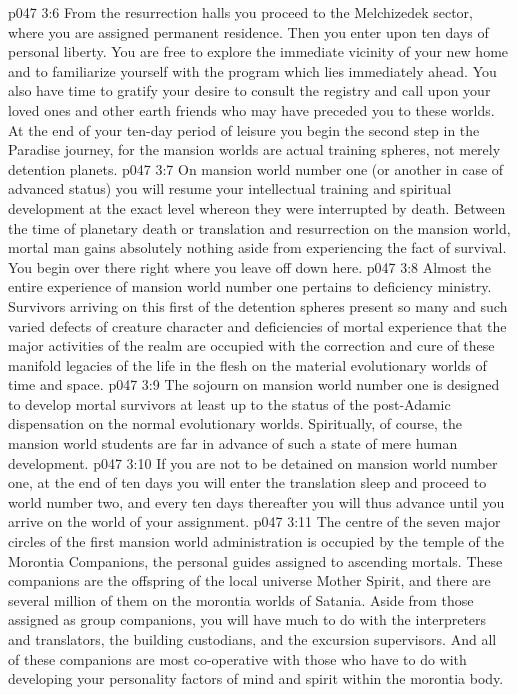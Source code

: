 \vs p047 3:6 \pc From the resurrection halls you proceed to the Melchizedek sector, where you are assigned permanent residence. Then you enter upon ten days of personal liberty. You are free to explore the immediate vicinity of your new home and to familiarize yourself with the program which lies immediately ahead. You also have time to gratify your desire to consult the registry and call upon your loved ones and other earth friends who may have preceded you to these worlds. At the end of your ten\hyp{}day period of leisure you begin the second step in the Paradise journey, for the mansion worlds are actual training spheres, not merely detention planets.
\vs p047 3:7 \pc On mansion world number one (or another in case of advanced status) you will resume your intellectual training and spiritual development at the exact level whereon they were interrupted by death. Between the time of planetary death or translation and resurrection on the mansion world, mortal man gains absolutely nothing aside from experiencing the fact of survival. You begin over there right where you leave off down here.
\vs p047 3:8 Almost the entire experience of mansion world number one pertains to deficiency ministry. Survivors arriving on this first of the detention spheres present so many and such varied defects of creature character and deficiencies of mortal experience that the major activities of the realm are occupied with the correction and cure of these manifold legacies of the life in the flesh on the material evolutionary worlds of time and space.
\vs p047 3:9 The sojourn on mansion world number one is designed to develop mortal survivors at least up to the status of the post\hyp{}Adamic dispensation on the normal evolutionary worlds. Spiritually, of course, the mansion world students are far in advance of such a state of mere human development.
\vs p047 3:10 If you are not to be detained on mansion world number one, at the end of ten days you will enter the translation sleep and proceed to world number two, and every ten days thereafter you will thus advance until you arrive on the world of your assignment.
\vs p047 3:11 \pc The centre of the seven major circles of the first mansion world administration is occupied by the temple of the Morontia Companions, the personal guides assigned to ascending mortals. These companions are the offspring of the local universe Mother Spirit, and there are several million of them on the morontia worlds of Satania. Aside from those assigned as group companions, you will have much to do with the interpreters and translators, the building custodians, and the excursion supervisors. And all of these companions are most co\hyp{}operative with those who have to do with developing your personality factors of mind and spirit within the morontia body.
